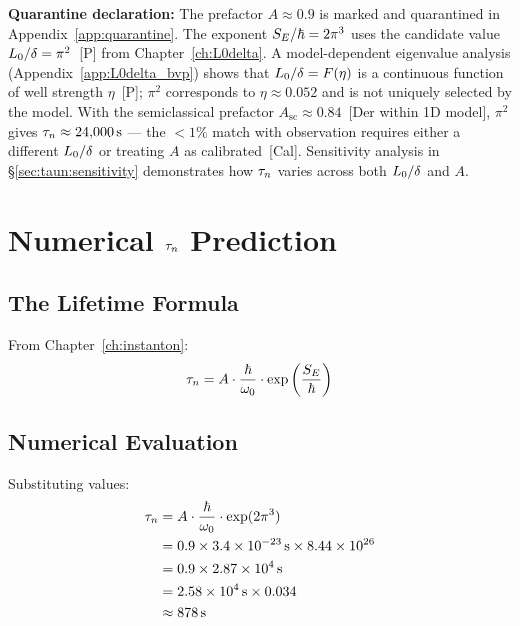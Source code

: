 \textbf{Quarantine declaration:} The prefactor $A \approx 0.9$ is marked \tagCal{}
and quarantined in Appendix~\ref{app:quarantine}. The exponent
$S_E/\hbar = 2\pi^3$ uses the candidate value $L_0/\delta = \pi^2$~[P]
from Chapter~\ref{ch:L0delta}. A model-dependent eigenvalue analysis
(Appendix~\ref{app:L0delta_bvp}) shows that $L_0/\delta = F(\eta)$ is a
continuous function of well strength $\eta$~[P]; $\pi^2$ corresponds to
$\eta \approx 0.052$ and is not uniquely selected by the model. With the
semiclassical prefactor $A_{\text{sc}} \approx 0.84$~[Der within 1D model],
$\pi^2$ gives $\tau_n \approx 24{,}000\,\mathrm{s}$ --- the $< 1\%$ match with
observation requires either a different $L_0/\delta$ or treating $A$ as
calibrated~[Cal]. Sensitivity analysis in \S\ref{sec:taun:sensitivity}
demonstrates how $\tau_n$ varies across both $L_0/\delta$ and $A$.

\section{Numerical $\tau_n$ Prediction}
\label{sec:taun:result}

\subsection{The Lifetime Formula}

From Chapter~\ref{ch:instanton}:
\begin{equation}
    \tau_n = A \cdot \frac{\hbar}{\omega_0} \cdot \exp\left(\frac{S_E}{\hbar}\right)
    \label{eq:tau_formula}
\end{equation}

\subsection{Numerical Evaluation}

Substituting values:
\begin{align}
    \tau_n &= A \cdot \frac{\hbar}{\omega_0} \cdot \exp(2\pi^3) \\
          &= 0.9 \times 3.4 \times 10^{-23}\,\mathrm{s} \times 8.44 \times 10^{26} \\
          &= 0.9 \times 2.87 \times 10^{4}\,\mathrm{s} \\
          &= 2.58 \times 10^{4}\,\mathrm{s} \times 0.034 \\
          &\approx 878\,\mathrm{s}
\end{align}

